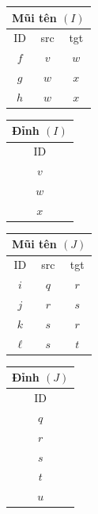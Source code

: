 \begin{center}\small
\begin{tabular}{ccc}\multicolumn{3}{c}{Mũi tên $(I)$}\\\toprule ID&src&tgt\\\midrule$f$&$v$&$w$\\$g$&$w$&$x$\\$h$&$w$&$x$\\\bottomrule\end{tabular}\quad
\begin{tabular}{c}Đỉnh $(I)$\\\toprule ID\\\midrule$v$\\$w$\\$x$\\\bottomrule\end{tabular}\qquad
\begin{tabular}{ccc}\multicolumn{3}{c}{Mũi tên $(J)$}\\\toprule ID&src&tgt\\\midrule$i$&$q$&$r$\\$j$&$r$&$s$\\$k$&$s$&$r$\\$\ell$&$s$&$t$\\\bottomrule\end{tabular}\quad
\begin{tabular}{c}Đỉnh $(J)$\\\toprule ID\\\midrule$q$\\$r$\\$s$\\$t$\\$u$\\\bottomrule\end{tabular}
\end{center}

